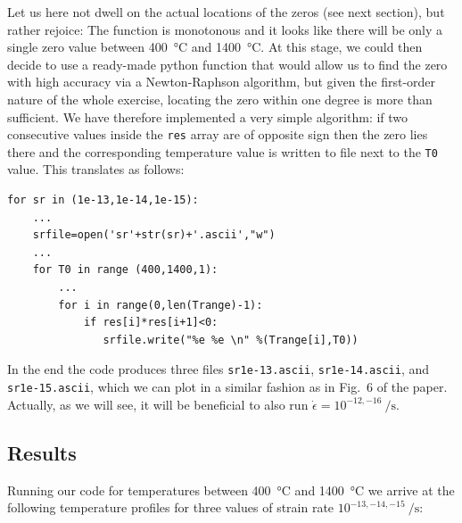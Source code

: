 Let us here not dwell on the actual locations of the zeros (see next section), 
but rather rejoice: The function is monotonous and it looks like there will 
be only a single zero value between 400~\si{\celsius} and 1400~\si{\celsius}. 
At this stage, we could then decide to use a ready-made python function that 
would allow us to find the zero with high accuracy via a Newton-Raphson algorithm, 
but given the first-order nature of the whole exercise, locating the 
zero within one degree is more than sufficient. We have therefore implemented
a very simple algorithm: if two consecutive values inside the \lstinline|res|
array are of opposite sign then the zero lies there and the corresponding 
temperature value is written to file next to the \lstinline|T0| value. 
This translates as follows:


\begin{lstlisting}
for sr in (1e-13,1e-14,1e-15):
    ...
    srfile=open('sr'+str(sr)+'.ascii',"w")
    ...
    for T0 in range (400,1400,1):
        ...
        for i in range(0,len(Trange)-1):
            if res[i]*res[i+1]<0: 
               srfile.write("%e %e \n" %(Trange[i],T0))
\end{lstlisting}

In the end the code produces three files
\verb|sr1e-13.ascii|, \verb|sr1e-14.ascii|, and \verb|sr1e-15.ascii|, 
which we can plot in a similar fashion as in Fig.~6 of the paper. 
Actually, as we will see, it will be beneficial to 
also run $\dot\epsilon=10^{-12,-16}~\si{\per\second}$.



\subsection*{Results}


Running our code for temperatures between 400~\si{\celsius} and 1400~\si{\celsius}
we arrive at the following temperature profiles for three values of strain rate 
$10^{-13,-14,-15}~\si{\per\second}$:

